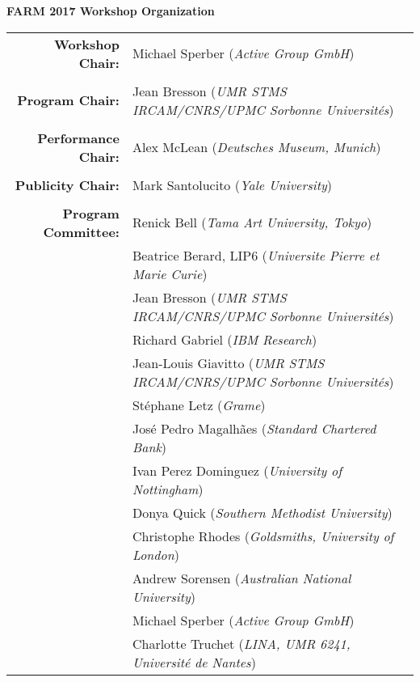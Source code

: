 \documentclass{acmart}
\begin{document}
\vspace{2mm}

\newpage
\begin{center}
{\bfseries \Huge FARM 2017 Workshop Organization}
\end{center}

\bigskip

\large
\begin{center}
\begin{tabular}{rl}

{\bf Workshop Chair:} & Michael Sperber (\emph{Active Group GmbH})\\
\\

{\bf Program Chair:} & Jean Bresson (\emph{UMR STMS IRCAM/CNRS/UPMC Sorbonne Universités})\\
  \\

  {\bf Performance Chair:} & Alex McLean (\emph{Deutsches Museum, Munich})\\
  \\

{\bf Publicity Chair:} & Mark Santolucito (\emph{Yale University})\\

\\
  
  {\bf Program Committee:} &
                             Renick Bell (\emph{Tama Art University, Tokyo})\\
  &Beatrice Berard, LIP6 (\emph{Universite Pierre et Marie Curie})\\
  &  Jean Bresson (\emph{UMR STMS IRCAM/CNRS/UPMC Sorbonne Universités})\\
  &  Richard Gabriel (\emph{IBM Research})\\
   & Jean-Louis Giavitto (\emph{UMR STMS IRCAM/CNRS/UPMC Sorbonne Universités})\\
   & Stéphane Letz (\emph{Grame})\\
   & José Pedro Magalhães (\emph{Standard Chartered Bank})\\
   & Ivan Perez Dominguez (\emph{University of Nottingham})\\
   & Donya Quick (\emph{Southern Methodist University})\\
    &Christophe Rhodes (\emph{Goldsmiths, University of London})\\
   & Andrew Sorensen (\emph{Australian National University})\\
   & Michael Sperber (\emph{Active Group GmbH})\\
   & Charlotte Truchet (\emph{LINA, UMR 6241, Université de Nantes})
\end{tabular}
\end{center}

\vspace{2mm}
\end{document}
